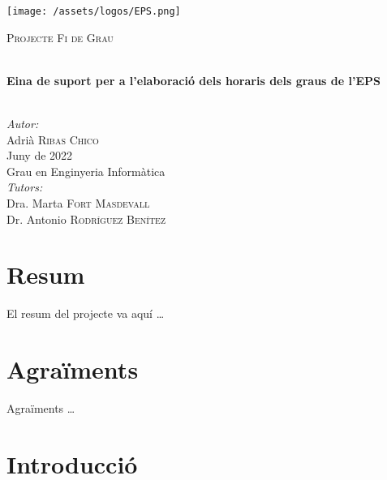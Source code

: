 \documentclass[a4paper,12pt]{ThesisStyle}
\begin{document}
\begin{titlepage}

\texttt{[image: /assets/logos/EPS.png]} \\[1cm]
\begin{center}
\textsc{\Large Projecte Fi de Grau} \\[1cm]

\begin{spacing}{2}
\HRule \\
\textbf{\Huge Eina de suport per a l’elaboració dels horaris dels graus de l’EPS} \\
\HRule \\[0.5cm]
\end{spacing}

{
\large
\emph{Autor:} \\
Adrià \textsc{Ribas Chico} \\[1cm]
Juny de 2022 \\[1cm]
Grau en Enginyeria Informàtica \\[1cm]
\emph{Tutors:} \\
Dra. Marta \textsc{Fort Masdevall} \\
Dr. Antonio \textsc{Rodríguez Benítez} \\
}

\end{center}
\end{titlepage}

\titlepage

\dominitoc


\chapter*{Resum}
\label{cap:resum}

El resum del projecte va aquí \ldots

\chapter*{Agraïments}
\label{cap:agraiments}

Agraïments \ldots


\tableofcontents



\mainmatter

\chapter{Introducció}
\label{cap:intro}
\end{document}

